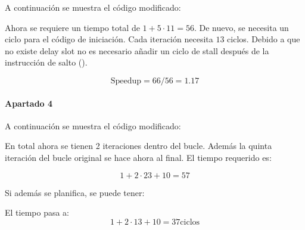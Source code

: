 A continuación se muestra el código modificado:



Ahora se requiere un tiempo total de $1 + 5 \cdot 11 = 56$. De nuevo, se
necesita un ciclo para el código de iniciación. Cada iteración necesita $13$
ciclos. Debido a que no existe delay slot no es necesario añadir un ciclo de
stall después de la instrucción de salto ().

\[
\textrm{Speedup} = 66/56 = 1.17
\]

\paragraph{Apartado 4}

A continuación se muestra el código modificado:



En total ahora se tienen 2 iteraciones dentro del bucle. Además la quinta
iteración del bucle original se hace ahora al final. El tiempo requerido es:

\[
1 + 2 \cdot 23 + 10 = 57
\]

Si además se planifica, se puede tener:



El tiempo pasa a:
\[
1 + 2 \cdot 13 + 10 = 37 \textrm{ciclos}
\]

\clearpage
